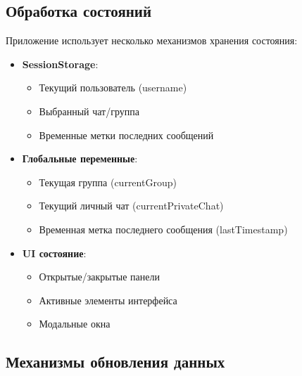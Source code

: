 \subsection{Обработка состояний}

Приложение использует несколько механизмов хранения состояния:

\begin{itemize}
	\item \textbf{SessionStorage}:
	\begin{itemize}
		\item Текущий пользователь (username)
		\item Выбранный чат/группа
		\item Временные метки последних сообщений
	\end{itemize}
	
	\item \textbf{Глобальные переменные}:
	\begin{itemize}
		\item Текущая группа (currentGroup)
		\item Текущий личный чат (currentPrivateChat)
		\item Временная метка последнего сообщения (lastTimestamp)
	\end{itemize}
	
	\item \textbf{UI состояние}:
	\begin{itemize}
		\item Открытые/закрытые панели
		\item Активные элементы интерфейса
		\item  Модальные окна
	\end{itemize}
	
\end{itemize}

\subsection{Механизмы обновления данных}

